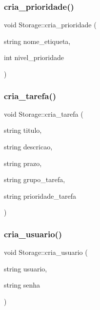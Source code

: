 \subsubsection{\texorpdfstring{cria\+\_\+prioridade()}{cria\_prioridade()}}
{\footnotesize\ttfamily void Storage\+::cria\+\_\+prioridade (\begin{DoxyParamCaption}\item[{string}]{nome\+\_\+etiqueta,  }\item[{int}]{nivel\+\_\+prioridade }\end{DoxyParamCaption})}

\mbox{\label{classStorage_a53b5c543a7eb6ca4bb7a83433b67e977}} 
\subsubsection{\texorpdfstring{cria\+\_\+tarefa()}{cria\_tarefa()}}
{\footnotesize\ttfamily void Storage\+::cria\+\_\+tarefa (\begin{DoxyParamCaption}\item[{string}]{titulo,  }\item[{string}]{descricao,  }\item[{string}]{prazo,  }\item[{string}]{grupo\+\_\+tarefa,  }\item[{string}]{prioridade\+\_\+tarefa }\end{DoxyParamCaption})}

\mbox{\label{classStorage_a572d1e337404b8819f1565be9689a271}} 
\subsubsection{\texorpdfstring{cria\+\_\+usuario()}{cria\_usuario()}}
{\footnotesize\ttfamily void Storage\+::cria\+\_\+usuario (\begin{DoxyParamCaption}\item[{string}]{usuario,  }\item[{string}]{senha }\end{DoxyParamCaption})}

\mbox{\label{classStorage_aca052dc1a570f55746a66f1dd7795354}} 
